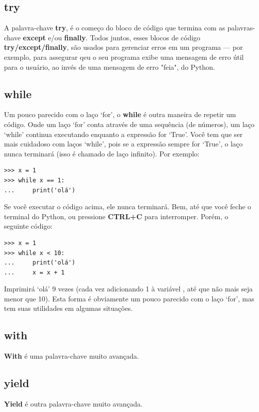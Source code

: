 \subsection*{try}

A palavra-chave \textbf{try}, é o começo do bloco de código que termina com as palavras-chave \textbf{except} e/ou \textbf{finally}. Todos juntos, esses blocos de código \textbf{try/except/finally}, são usados para gerenciar erros em um programa --- por exemplo, para assegurar qeu o seu programa exibe uma mensagem de erro útil para o usuário, ao invés de uma mensagem de erro "feia", do Python.

\subsection*{while}

Um pouco parecido com o laço `for', o \textbf{while} é outra maneira de repetir um código. Onde um laço `for' conta através de uma sequência (de números), um laço `while' continua executando enquanto a expressão for `True'. Você tem que ser mais cuidadoso com laços `while', pois se a expressão sempre for `True', o laço nunca terminará (isso é chamado de laço infinito). Por exemplo:

\begin{listingignore}
\begin{verbatim}
>>> x = 1
>>> while x == 1:
...     print('olá')
\end{verbatim}
\end{listingignore}

Se você executar o código acima, ele nunca terminará. Bem, até que você feche o terminal do Python, ou pressione \textbf{CTRL+C} para interromper. Porém, o seguinte código:

\begin{listing}
\begin{verbatim}
>>> x = 1
>>> while x < 10:
...     print('olá')
...     x = x + 1
\end{verbatim}
\end{listing}

Imprimirá `olá' 9 vezes (cada vez adicionando 1 à variável , até que  não mais seja menor que 10). Esta forma é obviamente um pouco parecido com o laço `for', mas tem suas utilidades em algumas situações.

\subsection*{with}

\textbf{With} é uma palavra-chave muito avançada.

\subsection*{yield}
\textbf{Yield} é outra palavra-chave muito avançada.

\newpage
